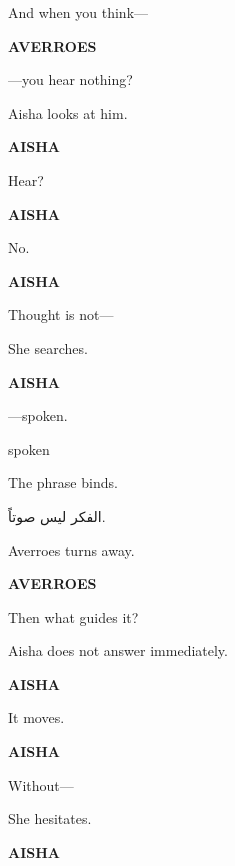 And when you think---

\medskip

\textbf{AVERROES}

---you hear nothing?

\medskip

Aisha looks at him.

\medskip

\textbf{AISHA}

Hear?

\medskip

\textbf{AISHA}

No.

\medskip

\textbf{AISHA}

Thought is not---

\medskip

She searches.

\medskip

\textbf{AISHA}

---spoken.

\medskip

 spoken

\medskip

The phrase binds.

\medskip


\medskip

\begin{AR}
الفكر ليس صوتاً.
\end{AR}

\medskip

Averroes turns away.

\medskip

\textbf{AVERROES}

Then what guides it?

\medskip

Aisha does not answer immediately.

\medskip

\textbf{AISHA}

It moves.

\medskip

\textbf{AISHA}

Without---

\medskip

She hesitates.

\medskip

\textbf{AISHA}

